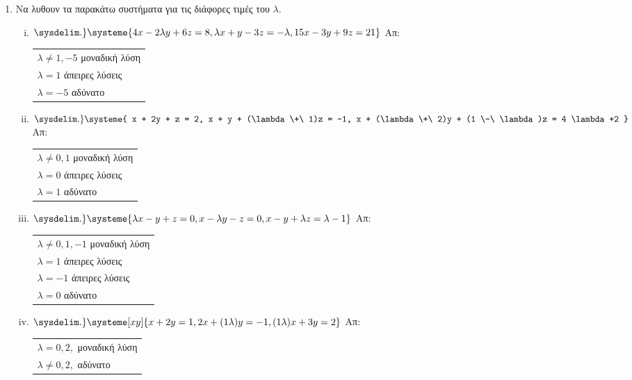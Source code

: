\begin{enumerate}
\begin{enumerate}[i)]
 \end{enumerate}

\item Να λυθουν τα παρακάτω συστήματα για τις διάφορες τιμές του $ \lambda $.

  \begin{enumerate}[i)]
    \setlength{\itemsep}{\baselineskip}
  \item $\sysdelim.\} \systeme{4x-2\lambda y + 6z = 8, \lambda x + y -3z = -\lambda, 15x -3y + 9z = 21
  } $ \hfill Απ: \begin{tabular}{l}
    $\lambda \neq 1,-5 $ μοναδική λύση \\
    $\lambda = 1 $ άπειρες λύσεις \\
    $\lambda =-5 $ αδύνατο
  \end{tabular}


\item $ \sysdelim.\} \systeme{
  x + 2y + z = 2, 
  x + y + (\lambda  \+\ 1)z = -1, 
  x + (\lambda  \+\ 2)y + (1 \-\ \lambda)z = 4 \lambda +2
} $ \hfill Απ: \begin{tabular}{l}
  $ \lambda \neq 0, 1 $ μοναδική λύση \\
  $ \lambda = 0 $ άπειρες λύσεις \\
  $ \lambda = 1 $ αδύνατο 
\end{tabular} 

\item $ \sysdelim.\} \systeme{
  \lambda x - y + z = 0,
  x - \lambda y - z = 0, 
  x - y + \lambda z = \lambda - 1
} $ \hfill Απ: \begin{tabular}{l}
  $ \lambda \neq 0, 1, -1 $ μοναδική λύση \\
  $ \lambda = 1$ άπειρες λύσεις \\
  $ \lambda = -1 $ άπειρες λύσεις \\
  $ \lambda = 0 $ αδύνατο
\end{tabular} 

\item $ \sysdelim.\} \systeme[xy]{
  x + 2y = 1,
  2x+(1 \- \lambda)y = -1, 
  (1 \- \lambda)x + 3y = 2
} $ \hfill Απ: \begin{tabular}{l}
  $ \lambda = 0, 2, $ μοναδική λύση \\
  $ \lambda \neq 0, 2, $ αδύνατο 
\end{tabular} 

  \end{enumerate}

\end{enumerate}


